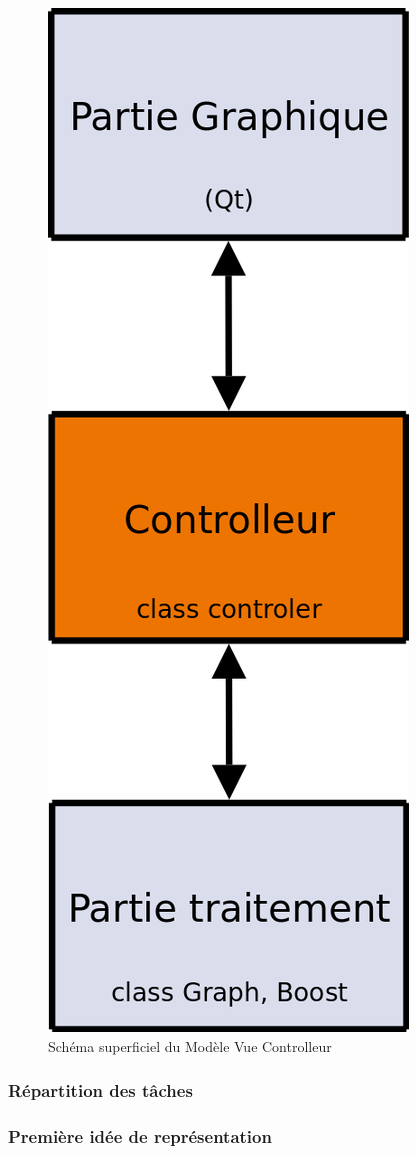 \begin{figure}[H]
\begin{center}
        \includegraphics[height=0.3\textheight]{../images/mvcScheme.png}
\caption{Schéma superficiel du Modèle Vue Controlleur}
\label{mvc}
\end{center}
\end{figure}
\subsubsection{Répartition des tâches}




\subsubsection{Première idée de représentation}


